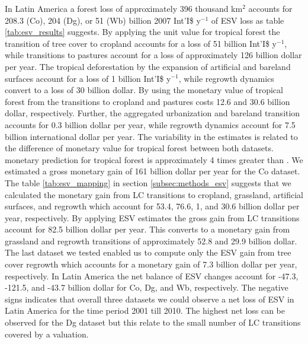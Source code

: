 		In Latin America a forest loss of approximately 396 thousand km$^2$ accounts for 208.3 (Co), 204 (Dg), or 51 (Wb) billion 2007 Int'I\$ y$^{-1}$ of \ac{ESV} loss as table \ref{tab:esv_results} suggests. By applying the \citet{Costanza2014} unit value for tropical forest the transition of tree cover to cropland accounts for a loss of 51 billion Int'I\$ y$^{-1}$, while transitions to pastures account for a loss of approximately 126 billion dollar per year. The tropical deforestation by the expansion of artificial and bareland surfaces account for a loss of 1 billion Int'I\$ y$^{-1}$, while regrowth dynamics convert to a loss of 30 billion dollar. By using the monetary value of tropical forest from \citet{Siikamaki2015} the transitions to cropland and pastures costs 12.6 and 30.6 billion dollar, respectively. Further, the aggregated urbanization and bareland transition accounts for 0.3 billion dollar per year, while regrowth dynamics account for 7.5 billion international dollar per year. The variability in the estimates is related to the difference of monetary value for tropical forest between both datasets. \citet{Costanza2014} monetary prediction for tropical forest is approximately 4 times greater than \citet{Siikamaki2015}. We estimated a gross monetary gain of 161 billion dollar per year for the Co dataset. The table \ref{tab:esv_mapping} in section \ref{subsec:methods_esv} suggests that we calculated the monetary gain from \ac{LC} transitions to cropland, grassland, artificial surfaces, and regrowth which account for 53.4, 76.6, 1, and 30.6 billion dollar per year, respectively. By applying \citet{Groot2012} \ac{ESV} estimates the gross gain from \ac{LC} transitions account for 82.5 billion dollar per year. This converts to a monetary gain from grassland and regrowth transitions of approximately 52.8 and 29.9 billion dollar. The last dataset we tested enabled us to compute only the \ac{ESV} gain from tree cover regrowth which accounts for a monetary gain of 7.3 billion dollar per year, respectively. In Latin America the net balance of \ac{ESV} changes account for -47.3, -121.5, and -43.7 billion dollar for Co, Dg, and Wb, respectively. The negative signs indicates that overall three datasets we could observe a net loss of \ac{ESV} in Latin America for the time period 2001 till 2010. The highest net loss can be observed for the Dg dataset but this relate to the small number of \ac{LC} transitions covered by a valuation.

